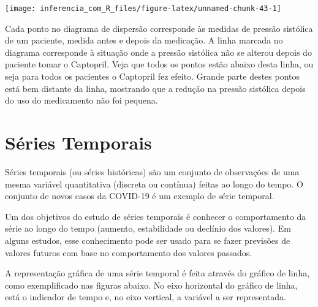 \documentclass[
]{book}
\begin{document}
\begin{center}\texttt{[image: inferencia\_com\_R\_files/figure-latex/unnamed-chunk-43-1]} \end{center}

Cada ponto no diagrama de dispersão corresponde às medidas de pressão sistólica de um paciente, medida antes e depois da medicação. A linha marcada no diagrama corresponde à situação onde a pressão sistólica não se alterou depois do paciente tomar o Captopril. Veja que todos os pontos estão abaixo desta linha, ou seja para todos os pacientes o Captopril fez efeito. Grande parte destes pontos está bem distante da linha, mostrando que a redução na pressão sistólica depois do uso do medicamento não foi pequena.

\hypertarget{suxe9ries-temporais}{%
\section{Séries Temporais}\label{suxe9ries-temporais}}

Séries temporais (ou séries históricas) são um conjunto de observações de uma mesma variável quantitativa (discreta ou contínua) feitas ao longo do tempo. O conjunto de novos casos da COVID-19 é um exemplo de série temporal.

Um dos objetivos do estudo de séries temporais é conhecer o comportamento da série ao longo do tempo (aumento, estabilidade ou declínio dos valores). Em alguns estudos, esse conhecimento pode ser usado para se fazer previsões de valores futuros com base no comportamento dos valores passados.

A representação gráfica de uma série temporal é feita através do gráfico de linha, como exemplificado nas figuras abaixo. No eixo horizontal do gráfico de linha, está o indicador de tempo e, no eixo vertical, a variável a ser representada.
\end{document}
